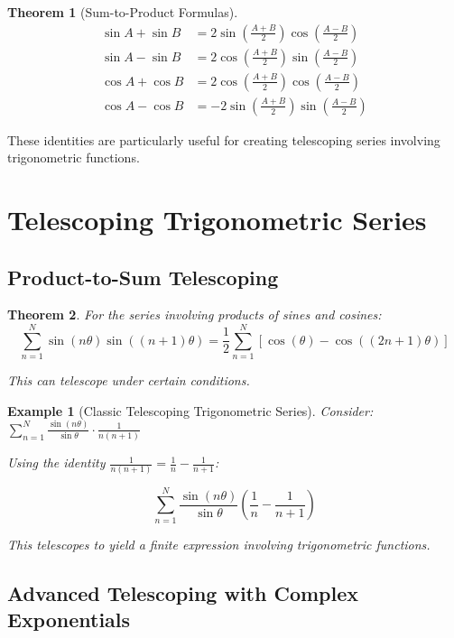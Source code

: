 \documentclass[12pt]{article}
\newtheorem{theorem}{Theorem}
\newtheorem{example}{Example}
\begin{document}
\begin{theorem}[Sum-to-Product Formulas]
\begin{align}
\sin A + \sin B &= 2\sin\left(\frac{A+B}{2}\right)\cos\left(\frac{A-B}{2}\right) \\
\sin A - \sin B &= 2\cos\left(\frac{A+B}{2}\right)\sin\left(\frac{A-B}{2}\right) \\
\cos A + \cos B &= 2\cos\left(\frac{A+B}{2}\right)\cos\left(\frac{A-B}{2}\right) \\
\cos A - \cos B &= -2\sin\left(\frac{A+B}{2}\right)\sin\left(\frac{A-B}{2}\right)
\end{align}
\end{theorem}

These identities are particularly useful for creating telescoping series involving trigonometric functions.

\section{Telescoping Trigonometric Series}

\subsection{Product-to-Sum Telescoping}

\begin{theorem}
For the series involving products of sines and cosines:
$$\sum_{n=1}^{N} \sin(n\theta)\sin((n+1)\theta) = \frac{1}{2}\sum_{n=1}^{N} [\cos(\theta) - \cos((2n+1)\theta)]$$

This can telescope under certain conditions.
\end{theorem}

\begin{example}[Classic Telescoping Trigonometric Series]
Consider: $\sum_{n=1}^{N} \frac{\sin(n\theta)}{\sin\theta} \cdot \frac{1}{n(n+1)}$

Using the identity $\frac{1}{n(n+1)} = \frac{1}{n} - \frac{1}{n+1}$:

$$\sum_{n=1}^{N} \frac{\sin(n\theta)}{\sin\theta} \left(\frac{1}{n} - \frac{1}{n+1}\right)$$

This telescopes to yield a finite expression involving trigonometric functions.
\end{example}

\subsection{Advanced Telescoping with Complex Exponentials}
\end{document}
